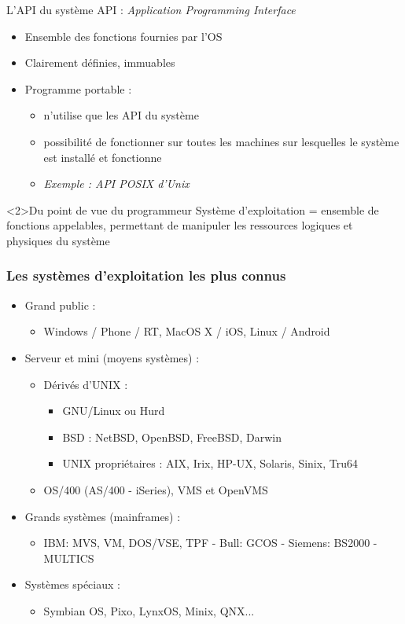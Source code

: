 \begin{frame}{L'API du système}
API : \textit{Application Programming Interface}
\begin{itemize}
\item Ensemble des fonctions fournies par l'OS
\item Clairement définies, immuables
\item Programme portable :
\begin{itemize}
\item n'utilise que les API du système
\item possibilité de fonctionner sur toutes les machines sur lesquelles le système est installé et fonctionne
\item \textit{Exemple : API POSIX d'Unix}
\end{itemize}
\end{itemize}
\begin{block}<2>{Du point de vue du programmeur}
Système d'exploitation = ensemble de fonctions appelables, permettant de manipuler les ressources logiques et physiques du système
\end{block}
\end{frame}


\begin{frame}
\frametitle{Les systèmes d'exploitation les plus connus}
\begin{itemize}
\item Grand public :
\begin{itemize}
\item Windows / Phone / RT, MacOS X / iOS, Linux / Android
\end{itemize}
\item Serveur et mini (moyens systèmes) :
\begin{itemize}
\item Dérivés d'UNIX :
\begin{itemize}
\item GNU/Linux ou Hurd
\item BSD : NetBSD, OpenBSD, FreeBSD, Darwin
\item UNIX propriétaires : AIX, Irix, HP-UX, Solaris, Sinix, Tru64
\end{itemize}
\item OS/400 (AS/400 - iSeries), VMS et OpenVMS
\end{itemize}
\item Grands systèmes (mainframes) :
\begin{itemize}
\item IBM: MVS, VM, DOS/VSE, TPF - Bull: GCOS - Siemens: BS2000 - MULTICS
\end{itemize}
\item Systèmes spéciaux :
\begin{itemize}
\item Symbian OS, Pixo, LynxOS, Minix, QNX...
\end{itemize}
\end{itemize}
\end{frame}


